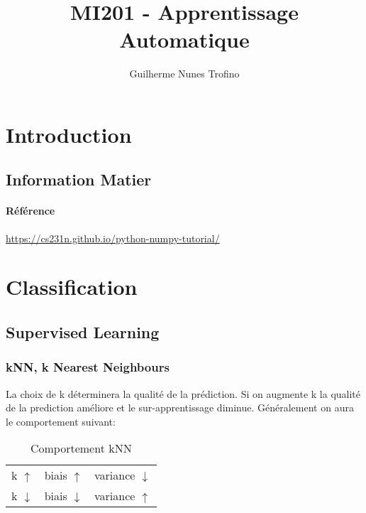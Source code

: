 \documentclass{article}
\title{MI201 - Apprentissage Automatique}
\author{Guilherme Nunes Trofino}
\begin{document}
\maketitle
\setlength{\parindent}{0pt}


\newpage\tableofcontents

\section{Introduction}

% 
% 


\subsection{Information Matier}
\paragraph{Référence}
\url{https://cs231n.github.io/python-numpy-tutorial/}


\section{Classification}

\subsection{Supervised Learning}
\subsubsection{kNN, k Nearest Neighbours}
La choix de k déterminera la qualité de la prédiction. Si on augmente k la qualité de la prediction améliore et le sur-apprentissage diminue. Généralement on aura le comportement suivant:
\begin{table}[H]
    \centering\begin{tabular}{lll}
        k $\uparrow  $ & biais $\uparrow  $ & variance $\downarrow$\\
        k $\downarrow$ & biais $\downarrow$ & variance $\uparrow$\\
    \end{tabular}
    \caption{Comportement kNN}
\end{table}
\end{document}
